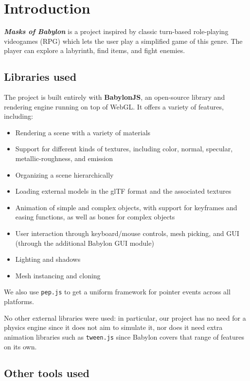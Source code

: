 
\chapter{Introduction}

\textbf{\textit{Masks of Babylon}} is a project inspired by classic turn-based role-playing videogames (RPG) which lets the user play a simplified game of this genre. The player can explore a labyrinth, find items, and fight enemies.

\section{Libraries used}

The project is built entirely with \textbf{BabylonJS}, an open-source library and rendering engine running on top of WebGL. It offers a variety of features, including:

\begin{itemize}
    \item Rendering a scene with a variety of materials
    \item Support for different kinds of textures, including color, normal, specular, metallic-roughness, and emission
    \item Organizing a scene hierarchically
    \item Loading external models in the glTF format and the associated textures
    \item Animation of simple and complex objects, with support for keyframes and easing functions, as well as bones for complex objects
    \item User interaction through keyboard/mouse controls, mesh picking, and GUI (through the additional Babylon GUI module)
    \item Lighting and shadows
    \item Mesh instancing and cloning
\end{itemize}

We also use \texttt{pep.js} to get a uniform framework for pointer events across all platforms.

No other external libraries were used: in particular, our project has no need for a physics engine since it does not aim to simulate it, nor does it need extra animation libraries such as \texttt{tween.js} since Babylon covers that range of features on its own.

\section{Other tools used}

